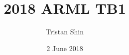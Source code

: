 \documentclass[a4paper, 12pt]{article}
\title{2018 ARML TB1}
\author{Tristan Shin}
\date{2 June 2018}
\begin{document}
\maketitle



\hrulefill


\end{document}
